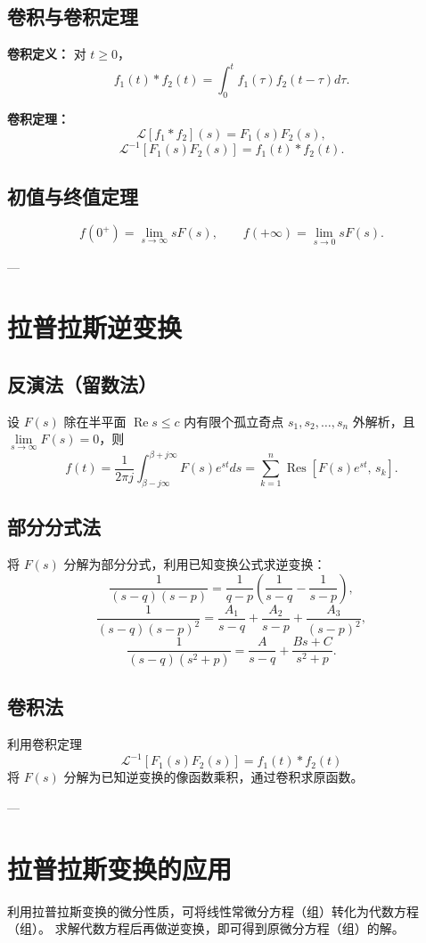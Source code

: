 \subsection{卷积与卷积定理}
\textbf{卷积定义：} 对 \( t\ge0 \)，
\[
f_1(t)*f_2(t) = \int_0^t f_1(\tau)f_2(t-\tau)d\tau.
\]

\textbf{卷积定理：}
\[
\mathscr{L}\left[f_1*f_2\right](s) = F_1(s)F_2(s),
\]
\[
\mathscr{L}^{-1}\left[F_1(s)F_2(s)\right] = f_1(t)*f_2(t).
\]

\subsection{初值与终值定理}
\[
f(0^+)=\lim_{s\to\infty}sF(s),\qquad
f(+\infty)=\lim_{s\to 0}sF(s).
\]

---

\section{拉普拉斯逆变换}

\subsection{反演法（留数法）}
设 \( F(s) \) 除在半平面 \( \operatorname{Re}s \le c \) 内有限个孤立奇点 \( s_1,s_2,\dots,s_n \) 外解析，且 \( \lim\limits_{s\to\infty}F(s)=0 \)，则
\[
f(t)
=
\frac{1}{2\pi j}\int_{\beta-j\infty}^{\beta+j\infty} F(s)e^{st}ds
=
\sum_{k=1}^n \operatorname{Res}\left[F(s)e^{st},\,s_k\right].
\]

\subsection{部分分式法}
将 \( F(s) \) 分解为部分分式，利用已知变换公式求逆变换：
\[
\frac{1}{(s-q)(s-p)} = \frac{1}{q-p}\left(\frac{1}{s-q}-\frac{1}{s-p}\right),
\]
\[
\frac{1}{(s-q)(s-p)^2} = \frac{A_1}{s-q}+\frac{A_2}{s-p}+\frac{A_3}{(s-p)^2},
\]
\[
\frac{1}{(s-q)(s^2+p)} = \frac{A}{s-q}+\frac{Bs+C}{s^2+p}.
\]

\subsection{卷积法}
利用卷积定理
\[
\mathscr{L}^{-1}\left[F_1(s)F_2(s)\right] = f_1(t)*f_2(t)
\]
将 \( F(s) \) 分解为已知逆变换的像函数乘积，通过卷积求原函数。

---

\section{拉普拉斯变换的应用}
利用拉普拉斯变换的微分性质，可将线性常微分方程（组）转化为代数方程（组）。
求解代数方程后再做逆变换，即可得到原微分方程（组）的解。